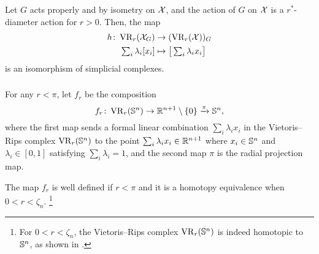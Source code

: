 \medskip\lemma
Let $G$ acts properly and by isometry on $\mathcal{X}$, and the action of $G$ on $\mathcal{X}$ is a $r^*$-diameter action for $r>0$.
Then, the map
\begin{align*}
	h \colon \operatorname{VR}_r(\mathcal{X}_G) &\to (\operatorname{VR}_r(\mathcal{X}))_G \\
	\textstyle\sum_i\lambda_i [x_i] &\mapsto \textstyle \big[\sum_i\lambda_i x_i\big]
\end{align*}
is an isomorphism of simplicial complexes.



\subsubsection{}\label{subsub:f}

For any $r<\pi$, let $f_r$ be the composition
\[
f_r \colon \operatorname{VR}_r(\mathbb{S}^n) \to \mathbb{R}^{n+1} \setminus \{0\} \xrightarrow{\pi} \mathbb{S}^n,
\]
where the first map sends a formal linear combination $\sum_i\lambda_i x_i$ in the Vietoris--Rips complex $\operatorname{VR}_r(\mathbb{S}^n)$ to the point $\sum_i\lambda_i x_i \in \mathbb{R}^{n+1}$ where $x_i \in \mathbb{S}^n$ and $\lambda_i \in [0,1]$ satisfying $\sum_i\lambda_i = 1$, and the second map $\pi$ is the radial projection map.

\medskip\lemma
The map $f_r$ is well defined if $r < \pi$ and it is a homotopy equivalence when $0 < r < \zeta_n$.
\footnote{For $0 < r < \zeta_n$, the Vietoris--Rips complex $\operatorname{VR}_r(\mathbb{S}^n)$ is indeed homotopic to $\mathbb{S}^n$, as shown in \cite[Theorem 7.1]{lim2020vietoris}.}

